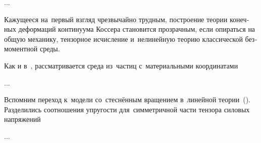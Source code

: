 \begin{otherlanguage}{russian}
...





Кажущееся на~первый взгляд чрезвычайно трудным, построение теории конечных деформаций континуума Коссера становится прозрачным, если опираться на общую механику, тензорное исчисление и~нелинейную теорию классической безмоментной среды.

Как и в~, рассматривается среда из~частиц с~материальными координатами

...





\label{para:caseoflatenttrihedron.largedisplacementsandrotations}

Вспомним переход к~модели со~стеснённым вращением в~линейной теории~(). Разделились соотношения упругости для~симметричной части тензора силовых напряжений

...




\end{otherlanguage}

\section*{\small \wordforbibliography}

